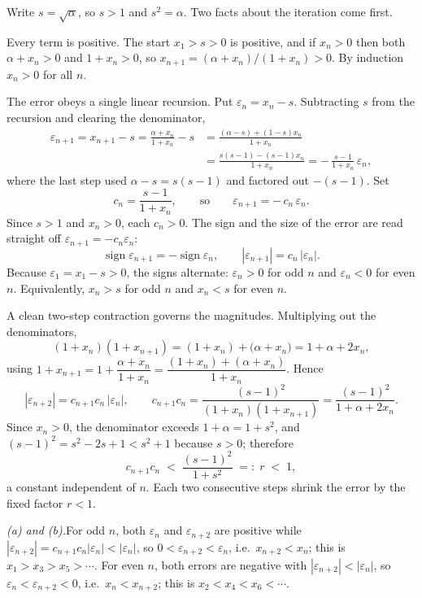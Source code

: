 \documentclass[main.tex]{subfiles}
\begin{document}
\begin{SolutionBlue}
Write $s=\sqrt{\alpha}$, so $s>1$ and $s^{2}=\alpha$. Two facts about the iteration come first.

Every term is positive. The start $x_{1}>s>0$ is positive, and if $x_{n}>0$ then both $\alpha+x_{n}>0$
and $1+x_{n}>0$, so $x_{n+1}=(\alpha+x_{n})/(1+x_{n})>0$. By induction $x_{n}>0$ for all $n$.

The error obeys a single linear recursion. Put $\varepsilon_{n}=x_{n}-s$. Subtracting $s$ from the
recursion and clearing the denominator,
\[
\begin{aligned}
\varepsilon_{n+1}=x_{n+1}-s=\frac{\alpha+x_{n}}{1+x_{n}}-s
&=\frac{(\alpha-s)+(1-s)x_{n}}{1+x_{n}}\\
&=\frac{s(s-1)-(s-1)x_{n}}{1+x_{n}}
=-\,\frac{s-1}{1+x_{n}}\,\varepsilon_{n},
\end{aligned}
\]
where the last step used $\alpha-s=s(s-1)$ and factored out $-(s-1)$. Set
\[
c_{n}=\frac{s-1}{1+x_{n}},\qquad\text{so}\qquad \varepsilon_{n+1}=-\,c_{n}\,\varepsilon_{n}.
\]
Since $s>1$ and $x_{n}>0$, each $c_{n}>0$. The sign and the size of the error are read straight off
$\varepsilon_{n+1}=-c_{n}\varepsilon_{n}$:
\[
\operatorname{sign}\varepsilon_{n+1}=-\operatorname{sign}\varepsilon_{n},\qquad
|\varepsilon_{n+1}|=c_{n}\,|\varepsilon_{n}|.
\]
Because $\varepsilon_{1}=x_{1}-s>0$, the signs alternate: $\varepsilon_{n}>0$ for odd $n$ and
$\varepsilon_{n}<0$ for even $n$. Equivalently, $x_{n}>s$ for odd $n$ and $x_{n}<s$ for even $n$.

A clean two-step contraction governs the magnitudes. Multiplying out the denominators,
\[
(1+x_{n})(1+x_{n+1})=(1+x_{n})+\bigl(\alpha+x_{n}\bigr)=1+\alpha+2x_{n},
\]
using $1+x_{n+1}=1+\dfrac{\alpha+x_{n}}{1+x_{n}}=\dfrac{(1+x_{n})+(\alpha+x_{n})}{1+x_{n}}$. Hence
\[
|\varepsilon_{n+2}|=c_{n+1}c_{n}\,|\varepsilon_{n}|,\qquad
c_{n+1}c_{n}=\frac{(s-1)^{2}}{(1+x_{n})(1+x_{n+1})}=\frac{(s-1)^{2}}{1+\alpha+2x_{n}}.
\]
Since $x_{n}>0$, the denominator exceeds $1+\alpha=1+s^{2}$, and $(s-1)^{2}=s^{2}-2s+1<s^{2}+1$ because
$s>0$; therefore
\[
c_{n+1}c_{n}\;<\;\frac{(s-1)^{2}}{1+s^{2}}\;=:\;r\;<\;1,
\]
a constant independent of $n$. Each two consecutive steps shrink the error by the fixed factor $r<1$.

\emph{(a) and (b).}\quad For odd $n$, both $\varepsilon_{n}$ and $\varepsilon_{n+2}$ are positive while
$|\varepsilon_{n+2}|=c_{n+1}c_{n}|\varepsilon_{n}|<|\varepsilon_{n}|$, so
$0<\varepsilon_{n+2}<\varepsilon_{n}$, i.e.\ $x_{n+2}<x_{n}$; this is $x_{1}>x_{3}>x_{5}>\cdots$. For
even $n$, both errors are negative with $|\varepsilon_{n+2}|<|\varepsilon_{n}|$, so
$\varepsilon_{n}<\varepsilon_{n+2}<0$, i.e.\ $x_{n}<x_{n+2}$; this is $x_{2}<x_{4}<x_{6}<\cdots$.


\end{SolutionBlue}
\end{document}
